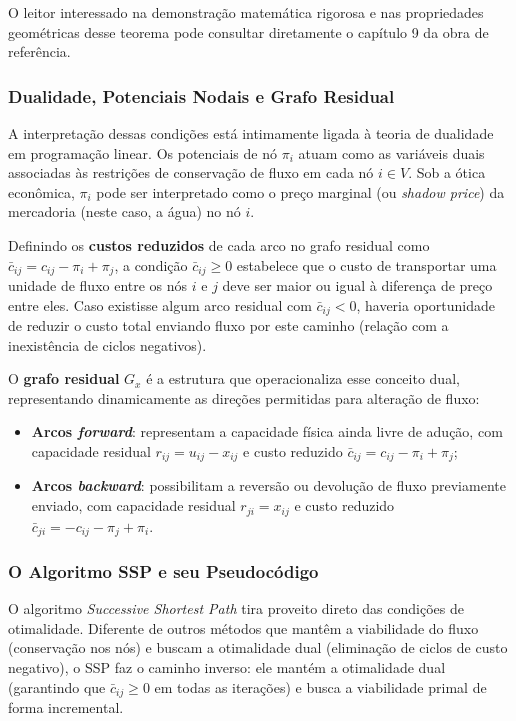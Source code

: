 O leitor interessado na demonstração matemática rigorosa e nas propriedades geométricas desse teorema pode consultar diretamente o capítulo 9 da obra de referência.

\subsubsection{Dualidade, Potenciais Nodais e Grafo Residual}

A interpretação dessas condições está intimamente ligada à teoria de dualidade em programação linear. Os potenciais de nó $\pi_i$ atuam como as variáveis duais associadas às restrições de conservação de fluxo em cada nó $i \in V$. Sob a ótica econômica, $\pi_i$ pode ser interpretado como o preço marginal (ou \textit{shadow price}) da mercadoria (neste caso, a água) no nó $i$.

Definindo os \textbf{custos reduzidos} de cada arco no grafo residual como $\bar{c}_{ij} = c_{ij} - \pi_i + \pi_j$, a condição $\bar{c}_{ij} \geq 0$ estabelece que o custo de transportar uma unidade de fluxo entre os nós $i$ e $j$ deve ser maior ou igual à diferença de preço entre eles. Caso existisse algum arco residual com $\bar{c}_{ij} < 0$, haveria oportunidade de reduzir o custo total enviando fluxo por este caminho (relação com a inexistência de ciclos negativos).

O \textbf{grafo residual} $G_x$ é a estrutura que operacionaliza esse conceito dual, representando dinamicamente as direções permitidas para alteração de fluxo:
\begin{itemize}
  \item \textbf{Arcos \textit{forward}}: representam a capacidade física ainda livre de adução, com capacidade residual $r_{ij} = u_{ij} - x_{ij}$ e custo reduzido $\bar{c}_{ij} = c_{ij} - \pi_i + \pi_j$;
  \item \textbf{Arcos \textit{backward}}: possibilitam a reversão ou devolução de fluxo previamente enviado, com capacidade residual $r_{ji} = x_{ij}$ e custo reduzido $\bar{c}_{ji} = -c_{ij} - \pi_j + \pi_i$.
\end{itemize}

\subsubsection{O Algoritmo SSP e seu Pseudocódigo}

O algoritmo \textit{Successive Shortest Path} tira proveito direto das condições de otimalidade. Diferente de outros métodos que mantêm a viabilidade do fluxo (conservação nos nós) e buscam a otimalidade dual (eliminação de ciclos de custo negativo), o SSP faz o caminho inverso: ele mantém a otimalidade dual (garantindo que $\bar{c}_{ij} \geq 0$ em todas as iterações) e busca a viabilidade primal de forma incremental.

